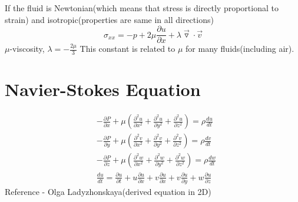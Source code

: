 \documentclass{report}
\begin{document}
If the fluid is Newtonian(which means that stress is directly proportional to strain) and isotropic(properties are same in all directions)
\[
  \sigma_{xx} = -p + 2 \mu \frac{\partial u}{\partial x} + \lambda \vec{\triangledown}\cdot\vec{v}
\]
$\mu$-viscosity, $\lambda = -\frac{2\mu}{3}$ This constant is related to $\mu$ for many fluids(including air). 
\section{Navier-Stokes Equation}
\begin{align*}
  &-\frac{\partial P}{\partial x} + \mu(\frac{\partial^2 u}{\partial x^2} + \frac{\partial^2 u}{\partial y^2} + \frac{\partial^2 u}{\partial z^2}) = \rho \frac{du}{dt} \\
  &-\frac{\partial P}{\partial y} + \mu(\frac{\partial^2 v}{\partial x^2} + \frac{\partial^2 v}{\partial y^2} + \frac{\partial^2 v}{\partial z^2}) = \rho \frac{dv}{dt} \\
  &-\frac{\partial P}{\partial z} + \mu(\frac{\partial^2 w}{\partial x^2} + \frac{\partial^2 w}{\partial y^2} + \frac{\partial^2 w}{\partial z^2}) = \rho \frac{dw}{dt} \\
  &\frac{du}{dt} = \frac{\partial u}{\partial t} + u \frac{\partial u}{\partial x} + v\frac{\partial u}{\partial x} + v \frac{\partial u}{\partial y} + w \frac{\partial u}{\partial z}
\end{align*}
Reference - Olga Ladyzhonskaya(derived equation in 2D)
\end{document}
